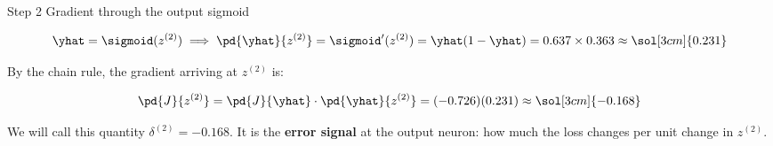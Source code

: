 \documentclass[12pt, a4paper]{article}
\begin{document}
\vspace{0.8em}

\begin{stepbox}{Step 2 \quad Gradient through the output sigmoid}

  \[
    \yhat = \sigmoid(z^{(2)})
    \implies
    \pd{\yhat}{z^{(2)}}
    = \sigmoid'(z^{(2)})
    = \yhat(1-\yhat)
    = 0.637 \times 0.363
    \approx \sol[3cm]{0.231}
  \]

  By the chain rule, the gradient arriving at $z^{(2)}$ is:

  \[
    \pd{J}{z^{(2)}}
    = \pd{J}{\yhat} \cdot \pd{\yhat}{z^{(2)}}
    = (-0.726)(0.231)
    \approx \sol[3cm]{-0.168}
  \]

  We will call this quantity $\delta^{(2)} = -0.168$.
  It is the \textbf{error signal} at the output neuron: how much the loss
  changes per unit change in $z^{(2)}$.
\end{stepbox}

\vspace{0.8em}
\end{document}
